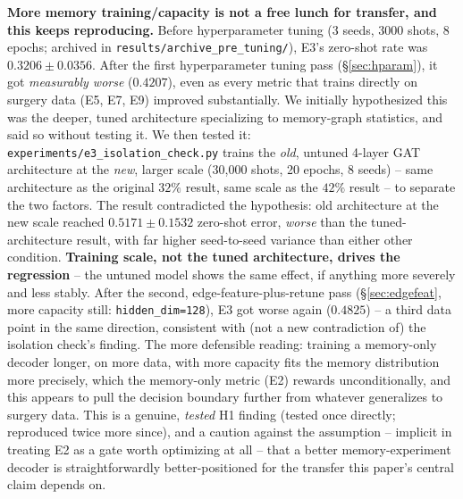 \documentclass[11pt]{article}
\begin{document}
\textbf{More memory training/capacity is not a free lunch for transfer, and
this keeps reproducing.} Before hyperparameter tuning (3 seeds, 3000 shots,
8 epochs; archived in \texttt{results/archive\_pre\_tuning/}), E3's
zero-shot rate was $0.3206 \pm 0.0356$. After the first hyperparameter
tuning pass (\S\ref{sec:hparam}), it got \emph{measurably worse} ($0.4207$),
even as every metric that trains directly on surgery data (E5, E7, E9)
improved substantially. We initially hypothesized this was the deeper,
tuned architecture specializing to memory-graph statistics, and said so
without testing it. We then tested it: \texttt{experiments/e3\_isolation\_check.py}
trains the \emph{old}, untuned 4-layer GAT architecture at the \emph{new},
larger scale (30{,}000 shots, 20 epochs, 8 seeds) -- same architecture as
the original $32\%$ result, same scale as the $42\%$ result -- to separate
the two factors. The result contradicted the hypothesis: old architecture
at the new scale reached $0.5171 \pm 0.1532$ zero-shot error, \emph{worse}
than the tuned-architecture result, with far higher seed-to-seed variance
than either other condition. \textbf{Training scale, not the tuned
architecture, drives the regression} -- the untuned model shows the same
effect, if anything more severely and less stably. After the second,
edge-feature-plus-retune pass (\S\ref{sec:edgefeat}, more capacity still:
\texttt{hidden\_dim=128}), E3 got worse again ($0.4825$) -- a third data
point in the same direction, consistent with (not a new contradiction of)
the isolation check's finding. The more defensible reading: training a
memory-only decoder longer, on more data, with more capacity fits the
memory distribution more precisely, which the memory-only metric (E2)
rewards unconditionally, and this appears to pull the decision boundary
further from whatever generalizes to surgery data. This is a genuine,
\emph{tested} H1 finding (tested once directly; reproduced twice more since),
and a caution against the assumption -- implicit in treating E2 as a gate
worth optimizing at all -- that a better memory-experiment decoder is
straightforwardly better-positioned for the transfer this paper's central
claim depends on.
\end{document}
